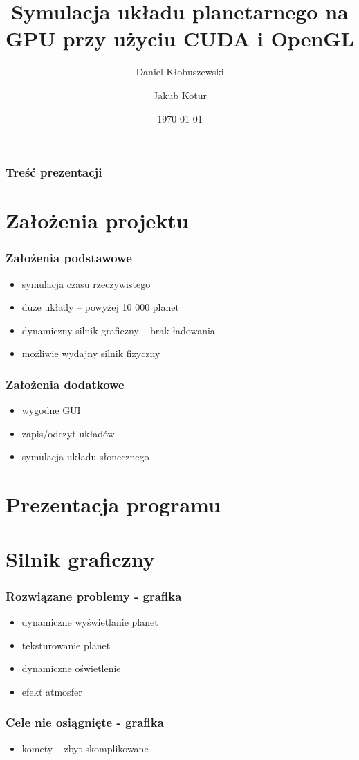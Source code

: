 \documentclass{beamer}
\title{Symulacja układu planetarnego na GPU przy użyciu CUDA i OpenGL}
\author{Daniel Kłobuszewski\and Jakub Kotur}
\institute{{\normalsize Promotor: Krzysztof Kaczmarski}\\\vspace{1cm} Politechnika Warszawska}
\date{\today}
\begin{document}
\frame{\titlepage}

\frame
{
	\frametitle{Treść prezentacji}
	\tableofcontents
}

\section{Założenia projektu}\label{sec:zalozenia}

\frame
{
	\frametitle{Założenia podstawowe}
	\begin{itemize}
	\item symulacja czasu rzeczywistego
	\item duże układy -- powyżej 10 000 planet
	\item dynamiczny silnik graficzny -- brak ładowania
	\item możliwie wydajny silnik fizyczny
	\end{itemize}
}

\frame
{
	\frametitle{Założenia dodatkowe}
	\begin{itemize}
	\item wygodne GUI
	\item zapis/odczyt układów
	\item symulacja układu słonecznego
	\end{itemize}
}
	

\section{Prezentacja programu}\label{sec:prezentacja programu}


\section{Silnik graficzny}\label{sec:silnik graficzny}

\frame
{
	\frametitle{Rozwiązane problemy - grafika}
	\begin{itemize}
	\item dynamiczne wyświetlanie planet
	\item teksturowanie planet
	\item dynamiczne oświetlenie
	\item efekt atmosfer
	\end{itemize}
}

\frame
{
	\frametitle{Cele nie osiągnięte - grafika}
	\begin{itemize}
	\item komety -- zbyt skomplikowane
	\end{itemize}
}
\end{document}

